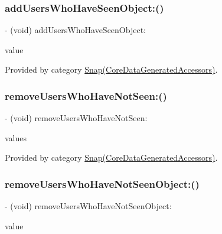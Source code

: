 \subsubsection{\texorpdfstring{add\+Users\+Who\+Have\+Seen\+Object\+:()}{addUsersWhoHaveSeenObject:()}}
{\footnotesize\ttfamily -\/ (void) add\+Users\+Who\+Have\+Seen\+Object\+: \begin{DoxyParamCaption}\item[{(\hyperlink{interface_friend}{Friend} $\ast$)}]{value }\end{DoxyParamCaption}}



Provided by category \hyperlink{category_snap_07_core_data_generated_accessors_08_a6841f827b13abc833d3ec7c40c522a1b}{Snap(\+Core\+Data\+Generated\+Accessors)}.

\hypertarget{interface_snap_aab479d17ca768b4132fbb78faded55fb}{}\label{interface_snap_aab479d17ca768b4132fbb78faded55fb} 
\subsubsection{\texorpdfstring{remove\+Users\+Who\+Have\+Not\+Seen\+:()}{removeUsersWhoHaveNotSeen:()}}
{\footnotesize\ttfamily -\/ (void) remove\+Users\+Who\+Have\+Not\+Seen\+: \begin{DoxyParamCaption}\item[{(N\+S\+Set$<$ \hyperlink{interface_friend}{Friend} $\ast$ $>$ $\ast$)}]{values }\end{DoxyParamCaption}}



Provided by category \hyperlink{category_snap_07_core_data_generated_accessors_08_aab479d17ca768b4132fbb78faded55fb}{Snap(\+Core\+Data\+Generated\+Accessors)}.

\hypertarget{interface_snap_a05c43e998f06072a2768e7db4b34a04d}{}\label{interface_snap_a05c43e998f06072a2768e7db4b34a04d} 
\subsubsection{\texorpdfstring{remove\+Users\+Who\+Have\+Not\+Seen\+Object\+:()}{removeUsersWhoHaveNotSeenObject:()}}
{\footnotesize\ttfamily -\/ (void) remove\+Users\+Who\+Have\+Not\+Seen\+Object\+: \begin{DoxyParamCaption}\item[{(\hyperlink{interface_friend}{Friend} $\ast$)}]{value }\end{DoxyParamCaption}}



